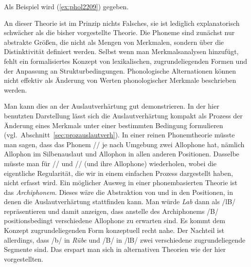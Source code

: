 
Als Beispiel wird (\ref{ex:phol2209}) gegeben.

\begin{exe}
  \ex\label{ex:phol2209}
  \begin{xlist}
  \end{xlist}
\end{exe}

An dieser Theorie ist im Prinzip nichts Falsches, sie ist lediglich explanatorisch schwächer als die bisher vorgestellte Theorie.
Die Phoneme sind zunächst nur abstrakte Größen, die nicht als Mengen von Merkmalen, sondern über die Distinktivität definiert werden.
Selbst wenn man Merkmalsanalysen hinzufügt, fehlt ein formalisiertes Konzept von lexikalischen, zugrundeliegenden Formen und der Anpassung an Strukturbedingungen.
Phonologische Alternationen können nicht effektiv als Änderung von Werten phonologischer Merkmale beschrieben werden.

Man kann dies an der Auslautverhärtung gut demonstrieren.
In der hier benutzten Darstellung lässt sich die Auslautverhärtung kompakt als Prozess der Änderung eines Merkmals unter einer bestimmten Bedingung formulieren (vgl.\ Abschnitt~\ref{sec:prozauslautverh}).
In einer reinen Phonemtheorie müsste man sagen, dass das Phonem // je nach Umgebung zwei Allophone hat, nämlich Allophon \textipa{[p]} im Silbenauslaut und Allophon \textipa{[b]} in allen anderen Positionen.
Dasselbe müsste man für // und // (und ihre Allophone) wiederholen, wobei die eigentliche Regularität, die wir in einem einfachen Prozess dargestellt haben, nicht erfasst wird.
Ein möglicher Ausweg in einer phonembasierten Theorie ist das \textit{Archiphonem}.
Dieses wäre \zB die Abstraktion von \textipa{[p]} und \textipa{[b]} in den Positionen, in denen die Auslautverhärtung stattfinden kann.
Man würde \textit{Lab} dann als /lB/ repräsentieren und damit anzeigen, dass anstelle des Archiphonems /B/ positionsbedingt verschiedene Allophone zu erwarten sind.
Es kommt dem Konzept zugrundeliegenden Form konzeptuell recht nahe.
Der Nachteil ist allerdings, dass /b/ in \textit{Rübe} und /B/ in /lB/ zwei verschiedene zugrundeliegende Segmente sind.
Das erspart man sich in alternativen Theorien wie der hier vorgestellten.

